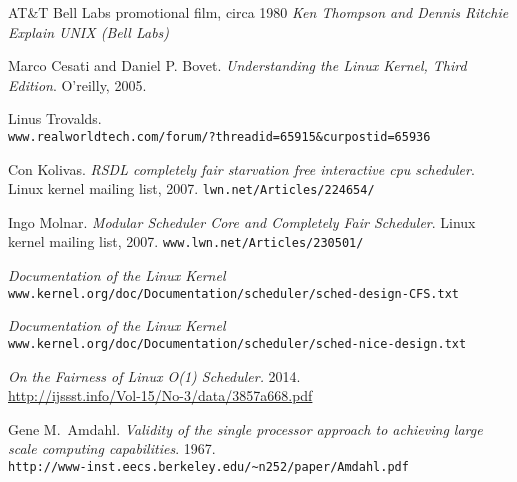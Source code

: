 \documentclass[10pt, oneside]{book}
\begin{document}
\frontmatter
\begin{titlepage}

\end{titlepage}

\tableofcontents
\listoffigures



\mainmatter







\begin{thebibliography}{}
AT\&T Bell Labs promotional film, circa 1980
\textit{Ken Thompson and Dennis Ritchie Explain UNIX (Bell Labs)} %

Marco Cesati and Daniel P. Bovet.
\textit{Understanding the Linux Kernel, Third Edition}.
O'reilly, 2005.

Linus Trovalds.\\
\texttt{www.realworldtech.com/forum/?threadid=65915\&curpostid=65936}

Con Kolivas.
\textit{RSDL completely fair starvation free interactive cpu scheduler}.
Linux kernel mailing list, 2007.
\texttt{lwn.net/Articles/224654/}

Ingo Molnar.
\textit{Modular Scheduler Core and Completely Fair Scheduler}.
Linux kernel mailing list, 2007. 
\texttt{www.lwn.net/Articles/230501/}

\textit{Documentation of the Linux Kernel}\\
\texttt{www.kernel.org/doc/Documentation/scheduler/sched-design-CFS.txt}

\textit{Documentation of the Linux Kernel}\\
\texttt{www.kernel.org/doc/Documentation/scheduler/sched-nice-design.txt}

\textit{On the Fairness of Linux O(1) Scheduler.} 2014.\\
\url{http://ijssst.info/Vol-15/No-3/data/3857a668.pdf}

Gene M.\ Amdahl.
\textit{Validity of the single processor approach to achieving large scale
computing capabilities}.
1967.\\
\texttt{http://www-inst.eecs.berkeley.edu/\textasciitilde n252/paper/Amdahl.pdf}


\end{thebibliography}
\end{document}
